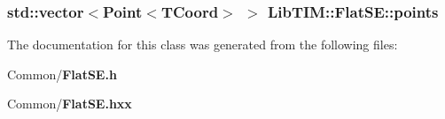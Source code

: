 \subsubsection{\setlength{\rightskip}{0pt plus 5cm}std::vector$<${\bf Point}$<${\bf TCoord}$>$ $>$ {\bf Lib\-TIM::Flat\-SE::points}\hspace{0.3cm}{\tt  [protected]}}\label{classLibTIM_1_1FlatSE_p0}




The documentation for this class was generated from the following files:\begin{CompactItemize}
\item 
Common/{\bf Flat\-SE.h}\item 
Common/{\bf Flat\-SE.hxx}\end{CompactItemize}
